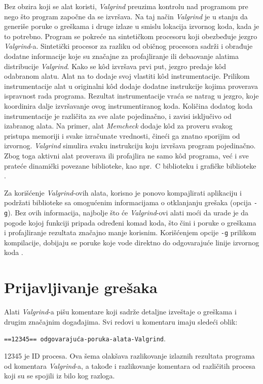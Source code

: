 \documentclass[12pt,oneside]{memoir}
\theoremstyle{plain}
\theoremstyle{definition}
\begin{document}
Bez obzira koji se alat koristi, \textit{Valgrind} preuzima kontrolu nad  programom pre nego što program započne da se izvršava. Na taj način \textit{Valgrind} je u stanju da generiše poruke o greškama i druge izlaze u smislu lokacija izvornog koda, kada je to potrebno. Program se pokreće na sintetičkom procesoru koji obezbeđuje jezgro \textit{Valgrind}-a. Sintetički procesor za razliku od običnog procesora sadrži i obrađuje dodatne informacije koje su značajne za profajliranje ili debaovanje alatima distribucije \textit{Valgrind}. Kako se k\^od izvršava prvi put, jezgro predaje k\^od odabranom alatu. Alat na to dodaje svoj vlastiti k\^od instrumentacije. Prilikom instrumentacije alat u originalni  k\^od dodaje dodatne instrukcije kojima proverava ispravnost rada programa. Rezultat instrumentacije vraća se natrag u jezgro, koje koordinira dalje izvršavanje ovog instrumentiranog koda. Količina dodatog koda instrumentacije je različita za sve alate pojedinačno, i zavisi isključivo od izabranog alata. Na primer, alat \textit{Memcheck} dodaje k\^od za proveru svakog pristupa memoriji i svake izračunate vrednosti, čineći ga znatno sporijim od izvornog. \textit{Valgrind} simulira svaku instrukciju koju izvršava program pojedinačno. Zbog toga aktivni alat proverava ili profajlira ne samo k\^od programa, već i sve prateće dinamički povezane biblioteke, kao npr.~C biblioteku i grafičke biblioteke \cite{ValgrindCore}.

Za korišćenje \textit{Valgrind}-ovih alata, korisno je ponovo kompajlirati aplikaciju i podržati biblioteke sa omogućenim informacijama o otklanjanju grešaka (opcija \texttt{-g}). Bez ovih informacija, najbolje što će \textit{Valgrind}-ovi alati moći da urade je da pogode kojoj funkciji pripada određeni komad koda, što čini i poruke o greškama i profajliranje rezultata značajno manje korisnim. Korišćenjem opcije \texttt{-g} prilikom kompilacije, dobijaju se poruke koje vode direktno do odgovarajuće linije izvornog koda \cite{ValgrindCore}.

\section{Prijavljivanje grešaka}
Alati \textit{Valgrind}-a pišu komentare koji sadrže detaljne izveštaje o greškama i drugim značajnim događajima. Svi redovi u komentaru imaju sledeći oblik:
\begin{center}
\texttt{==12345== odgovarajuća-poruka-alata-Valgrind}.
\end{center}
12345 je ID procesa. Ova šema olakšava razlikovanje izlaznih rezultata programa od komentara \textit{Valgrind}-a, a takođe i razlikovanje komentara od različitih procesa koji su se spojili iz bilo kog razloga.
\end{document}

